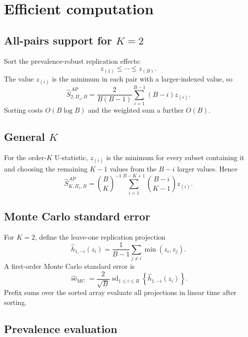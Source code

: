 \documentclass[11pt]{article}
\newcommand{\PSet}{\Pi_\star}
\theoremstyle{remark}
\begin{document}
\section{Efficient computation}
\label{app:computation}

\subsection{All-pairs support for $K=2$}

Sort the prevalence-robust replication effects:
\[
z_{(1)}\leq\cdots\leq z_{(B)}.
\]
The value $z_{(i)}$ is the minimum in each pair with a larger-indexed value, so
\begin{equation}
\widehat S_{2,\PSet,B}^{\,\mathrm{AP}}
=
\frac{2}{B(B-1)}
\sum_{i=1}^{B-1}
(B-i)z_{(i)}.
\label{eq:sorted-pairs}
\end{equation}
Sorting costs $O(B\log B)$ and the weighted sum a further $O(B)$.

\subsection{General $K$}

For the order-$K$ U-statistic, $z_{(i)}$ is the minimum for every subset containing it and choosing the remaining $K-1$ values from the $B-i$ larger values. Hence
\begin{equation}
\widehat S_{K,\PSet,B}^{\,\mathrm{AP}}
=
\binom{B}{K}^{-1}
\sum_{i=1}^{B-K+1}
\binom{B-i}{K-1}
z_{(i)}.
\label{eq:sorted-general-k}
\end{equation}

\subsection{Monte Carlo standard error}

For $K=2$, define the leave-one replication projection
\[
\widehat h_{1,-i}(z_i)
=
\frac{1}{B-1}
\sum_{j\ne i}
\min(z_i,z_j).
\]
A first-order Monte Carlo standard error is
\begin{equation}
\widehat{\operatorname{se}}_{\mathrm{MC}}
=
\frac{2}{\sqrt B}
\operatorname{sd}_{1\leq i\leq B}
\left\{
\widehat h_{1,-i}(z_i)
\right\}.
\label{eq:mcse}
\end{equation}
Prefix sums over the sorted array evaluate all projections in linear time after sorting.

\subsection{Prevalence evaluation}
\end{document}
